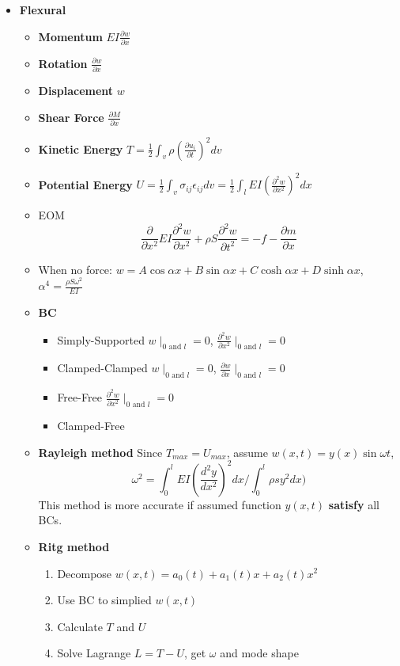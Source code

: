\documentclass{article}
\begin{document}
\begin{multicols*}{2}
\begin{itemize}
  \item\textbf{Flexural}
    \begin{itemize}
    \item \textbf{Momentum} $EI\frac{\partial w}{\partial x}$
    \item \textbf{Rotation} $\frac{\partial w}{\partial x}$
    \item \textbf{Displacement} $w$
    \item \textbf{Shear Force} $\frac{\partial M}{\partial x}$
    \item \textbf{Kinetic Energy} $T = \frac{1}{2}\int_v\rho (\frac{\partial u_i}{\partial t})^2 dv$
    \item \textbf{Potential Energy} $U = \frac{1}{2} \int_v \sigma_{ij} \epsilon_{ij} dv = \frac{1}{2} \int_l EI(\frac{\partial^2 w}{\partial x^2})^2 dx$
    \item EOM
      \begin{equation*}
        \frac{\partial}{\partial x^2} EI\frac{\partial^2 w}{\partial x^2} + \rho S \frac{\partial^2 w}{\partial t^2} = -f - \frac{\partial m}{\partial x}
      \end{equation*}
    \item When no force: $w = A\cos\alpha x + B\sin\alpha x + C\cosh\alpha x + D\sinh\alpha x$, $\alpha^4 = \frac{\rho S \omega^2}{EI}$
    \item \textbf{BC}
      \begin{itemize}
      \item Simply-Supported $w \mid_{0 \text{ and } l} = 0$, $\frac{\partial^2 w}{\partial x^2} \mid_{0 \text{ and } l} = 0$
      \item Clamped-Clamped $w \mid_{0 \text{ and } l} = 0$, $\frac{\partial w}{\partial x} \mid_{0 \text{ and } l} = 0$
      \item Free-Free $\frac{\partial^2 w}{\partial x^2} \mid_{0 \text{ and } l} = 0$
      \item Clamped-Free
      \end{itemize}
    \item \textbf{Rayleigh method} Since $T_{max} = U_{max}$, assume $w(x,t) = y(x) \sin\omega t$,
      \begin{equation*}
        \omega^2 = \int_0^l EI(\frac{d^2y}{dx^2})^2 dx / \int_0^l \rho s y^2 dx)
      \end{equation*}
      This method is more accurate if assumed function $y(x,t)$ \textbf{satisfy} all BCs.

    \item \textbf{Ritg method}
      \begin{enumerate}
      \item Decompose $w(x,t) = a_0(t) + a_1(t)x + a_2(t)x^2$
      \item Use BC to simplied $w(x,t)$
      \item Calculate $T$ and $U$
      \item Solve Lagrange $L = T - U$, get $\omega$ and mode shape
      \end{enumerate}
    \end{itemize}
  \end{itemize}


\end{multicols*}
\end{document}
